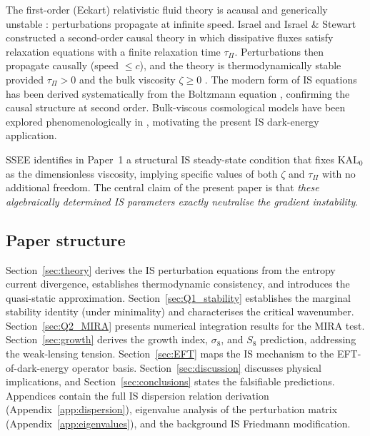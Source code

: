 \documentclass[12pt,a4paper]{article}
\newcommand{\KALz}{\mathrm{KAL}_0}
\newcommand{\tauPi}{\tau_\Pi}
\begin{document}
The first-order (Eckart) relativistic fluid theory \citep{Eckart1940} is acausal
\citep{Muller1967} and generically unstable \citep{HiscockLindblom1985}: perturbations propagate at
infinite speed.
Israel \citep{Israel1976} and Israel \& Stewart \citep{IsraelStewart1979}
constructed a second-order causal theory in which dissipative fluxes satisfy
relaxation equations with a finite relaxation time $\tauPi$.
Perturbations then propagate causally (speed $\leq c$), and the theory is
thermodynamically stable provided $\tauPi > 0$ and the bulk viscosity $\zeta \geq 0$
\citep{HiscockLindblom1983}.
The modern form of IS equations has been derived systematically from the Boltzmann
equation \citep{Denicol2012}, confirming the causal structure at second order.
Bulk-viscous cosmological models have been explored phenomenologically in
\citet{Brevik2005}, motivating the present IS dark-energy application.

SSEE identifies in Paper~1 a structural IS steady-state condition that fixes
$\KALz$ as the dimensionless viscosity, implying specific values of both $\zeta$
and $\tauPi$ with no additional freedom.
The central claim of the present paper is that \emph{these algebraically determined
IS parameters exactly neutralise the gradient instability}.

\subsection{Paper structure}
\label{subsec:outline}

Section~\ref{sec:theory} derives the IS perturbation equations from the entropy
current divergence, establishes thermodynamic consistency, and introduces
the quasi-static approximation.
Section~\ref{sec:Q1_stability} establishes the marginal stability identity (under minimality) and
characterises the critical wavenumber.
Section~\ref{sec:Q2_MIRA} presents numerical integration results for the MIRA test.
Section~\ref{sec:growth} derives the growth index, $\sigma_8$, and $S_8$
prediction, addressing the weak-lensing tension.
Section~\ref{sec:EFT} maps the IS mechanism to the EFT-of-dark-energy operator basis.
Section~\ref{sec:discussion} discusses physical implications, and
Section~\ref{sec:conclusions} states the falsifiable predictions.
Appendices contain the full IS dispersion relation derivation (Appendix~\ref{app:dispersion}),
eigenvalue analysis of the perturbation matrix (Appendix~\ref{app:eigenvalues}),
and the background IS Friedmann modification.

\end{document}
